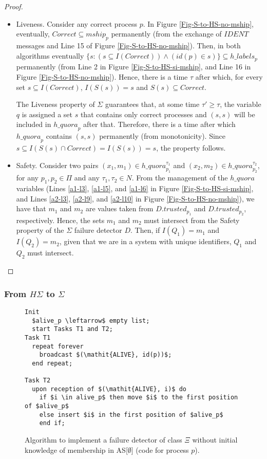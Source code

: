 \documentclass[10pt, conference, compsocconf]{IEEEtran}
\newcommand{\HS}{{H\Sigma}}
\newcommand{\C}{{\mathit{Correct}}}
\newcommand{\quora}{{\mathit{h\_quora}}}
\newcommand{\labels}{{\mathit{h\_labels}}}
\begin{document}
\begin{proof}
\begin{itemize}
\item Liveness.
Consider any correct process $p$. In Figure \ref{Fig-S-to-HS-no-mship},  eventually, $\C \subseteq mship_p$ permanently (from the exchange of $\mathit{IDENT}$ messages and Line 15 of Figure \ref{Fig-S-to-HS-no-mship}). Then, in both algorithms eventually 
$\{s: (s \subseteq I(\C)) \wedge (id(p) \in s)\}  \subseteq \labels_p $ permanently (from Line 2 in Figure \ref{Fig-S-to-HS-si-mship}, and Line 16 in Figure \ref{Fig-S-to-HS-no-mship}). Hence, there is a time $\tau$ after which, for every set $s \subseteq I(\C)$, $I(S(s)) = s$ and $S(s) \subseteq \C$.

The Liveness property of $\Sigma$ guarantees that, at some time $\tau' \ge \tau$, the variable $q$ is assigned  a set  $s$ that contains only correct processes and $(s,s)$ will be included in $\quora_p$ after that. Therefore, there is a time after which $\quora_p$ contains $(s,s)$ permanently (from monotonicity).  Since $s \subseteq I(S(s) \cap \C)=I(S(s))=s$, the property follows.
 
\item Safety.
Consider two pairs $(x_1,m_1) \in \quora_{p_1}^{\tau_1}$ and $(x_2,m_2) \in \quora_{p_2}^{\tau_2}$, for any $p_1, p_2 \in \Pi$ and any $\tau_1, \tau_2 \in N$. From the management of the $\quora$ variables (Lines \ref{a1-l3}, \ref{a1-l5}, and \ref{a1-l6} in Figure \ref{Fig-S-to-HS-si-mship}, and Lines \ref{a2-l3}, \ref{a2-l9}, and \ref{a2-l10} in Figure \ref{Fig-S-to-HS-no-mship}), we have that $m_1$ and $m_2$ are values taken from $D.trusted_{p_1}$ and $D.trusted_{p_2}$, respectively. Hence, the sets $m_1$ and $m_2$ must intersect from the Safety property of the $\Sigma$ failure detector $D$. Then, if $I(Q_1) = m_1$ and  $I(Q_2) = m_2$, given that we are in a system with unique identifiers, $Q_1$ and $Q_2$ must intersect.
\end{itemize}
\end{proof}

\subsubsection{From $\HS$ to $\Sigma$}

\begin{figure}
\begin{lstlisting}
Init
  $alive_p \leftarrow$ empty list;
  start Tasks T1 and T2;
Task T1
  repeat forever
    broadcast $(\mathit{ALIVE}, id(p))$;
  end repeat;

Task T2	
  upon reception of $(\mathit{ALIVE}, i)$ do
    if $i \in alive_p$ then move $i$ to the first position of $alive_p$
    else insert $i$ in the first position of $alive_p$
    end if;
\end{lstlisting}		
\caption{Algorithm to implement a failure detector of class $\Xi$ without initial knowledge of membership in AS[$\emptyset$] (code for process $p$).}
\label{Fig-Xi}
\end{figure}
\end{document}
